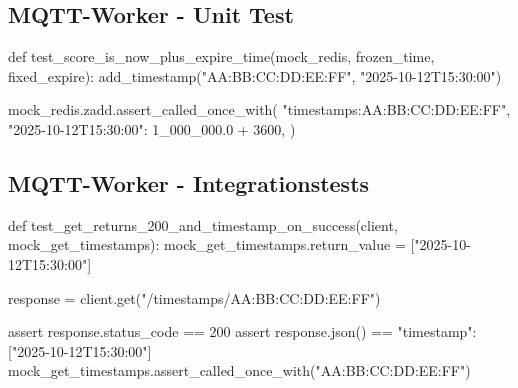 \newpage

\subsection{MQTT-Worker - Unit Test}

\begin{CodeBox}
def test_score_is_now_plus_expire_time(mock_redis, frozen_time, fixed_expire):
  add_timestamp("AA:BB:CC:DD:EE:FF", "2025-10-12T15:30:00")

  mock_redis.zadd.assert_called_once_with(
    "timestamps:AA:BB:CC:DD:EE:FF",
    {"2025-10-12T15:30:00": 1_000_000.0 + 3600},
)
\end{CodeBox}

\subsection{MQTT-Worker - Integrationstests}

\begin{CodeBox}
def test_get_returns_200_and_timestamp_on_success(client, mock_get_timestamps):
  mock_get_timestamps.return_value = ["2025-10-12T15:30:00"]

  response = client.get("/timestamps/AA:BB:CC:DD:EE:FF")

  assert response.status_code == 200
  assert response.json() == {"timestamp": ["2025-10-12T15:30:00"]}
  mock_get_timestamps.assert_called_once_with("AA:BB:CC:DD:EE:FF")
\end{CodeBox}
